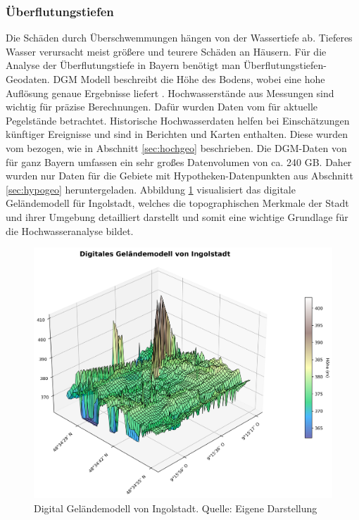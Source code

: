 \subsubsection{Überflutungstiefen}\label{sec:tief}
Die Schäden durch Überschwemmungen hängen von der Wassertiefe ab. Tieferes Wasser verursacht meist größere und teurere Schäden an Häusern. Für die Analyse der Überflutungstiefe in Bayern benötigt man Überflutungstiefen-Geodaten. \ac{DGM} Modell beschreibt die Höhe des Bodens, wobei eine hohe Auflösung genaue Ergebnisse liefert \parencite{vermessungsverwaltung2019gelandemodell}. Hochwasserstände aus Messungen sind wichtig für präzise Berechnungen. Dafür wurden Daten vom \textcite{bayern2016hochwassernachrichtendienst} für aktuelle Pegelstände betrachtet. Historische Hochwasserdaten helfen bei Einschätzungen künftiger Ereignisse und sind in Berichten und Karten enthalten. Diese wurden vom \textcite{LfU_Bayern} bezogen, wie in Abschnitt \ref{sec:hochgeo} beschrieben.
Die \ac{DGM}-Daten von \textcite{vermessungsverwaltung2019gelandemodell} für ganz Bayern umfassen ein sehr großes Datenvolumen von ca. 240 GB. Daher wurden nur Daten für die Gebiete mit Hypotheken-Datenpunkten aus Abschnitt \ref{sec:hypogeo} heruntergeladen. Abbildung \ref{fig:ingolstadt} visualisiert das digitale Geländemodell für Ingolstadt, welches die topographischen Merkmale der Stadt und ihrer Umgebung detailliert darstellt und somit eine wichtige Grundlage für die Hochwasseranalyse bildet.
\begin{figure}[!ht]
    \centering
    \includegraphics[width=\textwidth]{figures/dgm_3d_wireframe_ingolstadt.png}
    \caption{Digital Geländemodell von Ingolstadt. Quelle: Eigene Darstellung}
    \label{fig:ingolstadt}
\end{figure}
\FloatBarrier